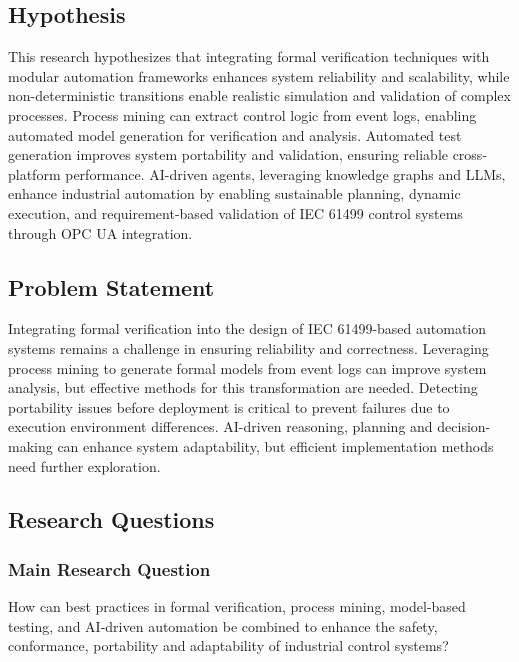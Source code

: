 \subsection{Hypothesis}
This research hypothesizes that integrating formal verification techniques with modular automation frameworks enhances system reliability and scalability, while non-deterministic transitions enable realistic simulation and validation of complex processes. Process mining can extract control logic from event logs, enabling automated model generation for verification and analysis. Automated test generation improves system portability and validation, ensuring reliable cross-platform performance. AI-driven agents, leveraging knowledge graphs and LLMs, enhance industrial automation by enabling sustainable planning, dynamic execution, and requirement-based validation of IEC 61499 control systems through OPC UA integration.

\subsection{Problem Statement}
Integrating formal verification into the design of IEC 61499-based automation systems remains a challenge in ensuring reliability and correctness. Leveraging process mining to generate formal models from event logs can improve system analysis, but effective methods for this transformation are needed. Detecting portability issues before deployment is critical to prevent failures due to execution environment differences. AI-driven reasoning, planning and decision-making can enhance system adaptability, but efficient implementation methods need further exploration.

\subsection{Research Questions}
\subsubsection{Main Research Question}
How can best practices in formal verification, process mining, model-based testing, and AI-driven automation be combined to enhance the safety, conformance, portability and adaptability of industrial control systems?

